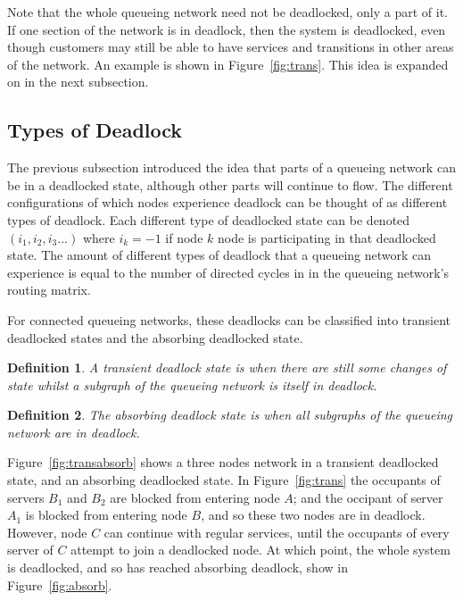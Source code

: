 \documentclass{article}
\newtheorem{definition}{Definition}
\begin{document}
Note that the whole queueing network need not be deadlocked, only a part of it.
If one section of the network is in deadlock, then the system is deadlocked, even though customers may still be able to have services and transitions in other areas of the network.
An example is shown in Figure~\ref{fig:trans}.
This idea is expanded on in the next subsection.

\subsection{Types of Deadlock}
The previous subsection introduced the idea that parts of a queueing network can be in a deadlocked state, although other parts will continue to flow.
The different configurations of which nodes experience deadlock can be thought
of as different types of deadlock.
Each different type of deadlocked state can be denoted $(i_1, i_2, i_3...)$ where $i_k = -1$ if node $k$ node is participating in that deadlocked state.
The amount of different types of deadlock that a queueing network can experience
is equal to the number of directed cycles in in the queueing network's routing
matrix. %

For connected queueing networks, these deadlocks can be classified into transient deadlocked states and the absorbing deadlocked state.\\


\begin{definition}
    A transient deadlock state is when there are still some changes of state
    whilst a subgraph of the queueing network is itself in deadlock.\\
\end{definition}

\begin{definition}
    The absorbing deadlock state is when all subgraphs of the
    queueing network are in deadlock.\\
\end{definition}

Figure~\ref{fig:transabsorb} shows a three nodes network in a transient deadlocked state, and an absorbing deadlocked state.
In Figure~\ref{fig:trans} the occupants of servers $B_1$ and $B_2$ are blocked from entering node $A$; and the occipant of server $A_1$ is blocked from entering node $B$, and so these two nodes are in deadlock.
However, node $C$ can continue with regular services, until the occupants of every server of $C$ attempt to join a deadlocked node.
At which point, the whole system is deadlocked, and so has reached absorbing deadlock, show in Figure~\ref{fig:absorb}.
\end{document}
